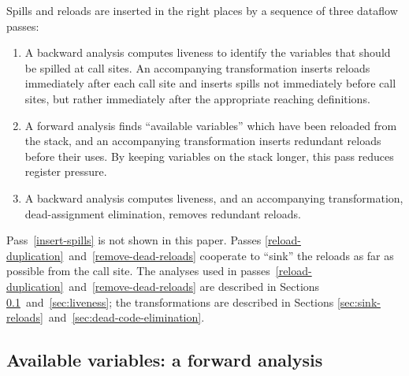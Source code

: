 \documentclass[blockstyle,preprint,natbib,nocopyrightspace]{sigplanconf}
\def\authornote#1{\unskip\relax}
\newcommand{\simon}[1]{\authornote{SLPJ: #1}}
\newcommand\secreftwo[2]{Sections \ref{sec:#1}~and~\ref{sec:#2}}
\newcommand\seclabel[1]{\label{sec:#1}}
\begin{document}
Spills and reloads are inserted in the right places
by a sequence of three dataflow passes:
\begin{enumerate}
\item
\label{insert-spills}
A backward analysis computes liveness
to identify the variables that should be spilled at call sites.
An accompanying transformation inserts reloads immediately after each call
site and inserts spills not immediately before call sites, but
rather immediately after the appropriate reaching definitions.
\item
\label{reload-duplication}
A forward analysis finds ``available variables'' which have been reloaded
from the stack, and an accompanying transformation
inserts redundant reloads before their uses.
By keeping variables on the stack longer, this pass reduces register pressure.
\item
\label{remove-dead-reloads}
A backward analysis computes liveness,
and an accompanying transformation, dead-assignment elimination,
removes redundant reloads.
\end{enumerate}
Pass~\ref{insert-spills} is not shown in this paper.
Passes
\ref{reload-duplication}~and~\ref{remove-dead-reloads} cooperate to ``sink''
the reloads as far as possible from the call site.
The analyses used in
passes~\ref{reload-duplication}~and~\ref{remove-dead-reloads}
are described in \secreftwo{avail}{liveness};
the transformations are described in
\secreftwo{sink-reloads}{dead-code-elimination}.



\subsection{Available variables: a forward analysis} 

\seclabel{avail}
\end{document}
